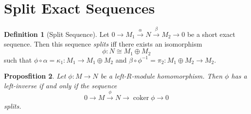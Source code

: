 \documentclass{book}
\newtheorem{prop}{Proposfition}[chapter]
\theoremstyle{definition}
\newtheorem{df}[prop]{Definition}
\newcommand{\coker}{\ensuremath{\operatorname{coker}}}
\newcommand{\inv}[1]{\ensuremath{{#1}^{-1}}}
\begin{document}
\section{Split Exact Sequences}

\begin{df}[Split Sequence]
Let $0 \rightarrow M_1 \stackrel{\alpha}{\rightarrow} N \stackrel{\beta}{\rightarrow} M_2 \rightarrow 0$ be a short exact sequence. Then this sequence \emph{splits} iff there exists an isomorphism
\[ \phi : N \cong M_1 \oplus M_2 \]
such that $\phi \circ \alpha = \kappa_1 : M_1 \rightarrow M_1 \oplus M_2$ and $\beta \circ \inv{\phi} = \pi_2 : M_1 \oplus M_2 \rightarrow M_2$.
\end{df}

\begin{prop}
Let $\phi : M \rightarrow N$ be a left-$R$-module homomorphism. Then $\phi$ has a left-inverse if and only if the sequence
\[ 0 \rightarrow M \stackrel{\phi}{\rightarrow} N \rightarrow \coker \phi \rightarrow 0 \]
splits.
\end{prop}
\end{document}
